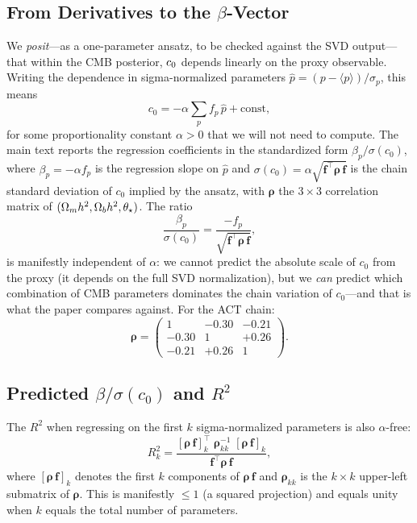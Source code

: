 \subsection{From Derivatives to the \texorpdfstring{$\beta$}{beta}-Vector}
\label{app:beta_derivation}

We \emph{posit}---as a one-parameter ansatz, to be checked against the SVD output---that within the CMB posterior, $c_0$ depends linearly on the proxy observable. Writing the dependence in sigma-normalized parameters $\hat{p} = (p - \langle p \rangle)/\sigma_p$, this means
\begin{equation}
c_0 = -\alpha \sum_p f_p \, \hat{p} + \mathrm{const},
\label{eq:c0_linear_model}
\end{equation}
for some proportionality constant $\alpha > 0$ that we will not need to compute. The main text reports the regression coefficients in the standardized form $\beta_p / \sigma(c_0)$, where $\beta_p = -\alpha f_p$ is the regression slope on $\hat{p}$ and $\sigma(c_0) = \alpha \sqrt{\mathbf{f}^\top \boldsymbol{\rho}\, \mathbf{f}}$ is the chain standard deviation of $c_0$ implied by the ansatz, with $\boldsymbol{\rho}$ the $3 \times 3$ correlation matrix of $(\Omega_m h^2, \Omega_b h^2, \theta_\star)$. The ratio
\begin{equation}
\frac{\beta_p}{\sigma(c_0)} = \frac{-f_p}{\sqrt{\mathbf{f}^\top \boldsymbol{\rho}\, \mathbf{f}}},
\label{eq:beta_over_sigma}
\end{equation}
is manifestly independent of $\alpha$: we cannot predict the absolute scale of $c_0$ from the proxy (it depends on the full SVD normalization), but we \emph{can} predict which combination of CMB parameters dominates the chain variation of $c_0$---and that is what the paper compares against. For the ACT chain:
\begin{equation}
\boldsymbol{\rho} = \begin{pmatrix} 1 & -0.30 & -0.21 \\ -0.30 & 1 & +0.26 \\ -0.21 & +0.26 & 1 \end{pmatrix}.
\label{eq:rho_matrix}
\end{equation}

\subsection{Predicted \texorpdfstring{$\beta/\sigma(c_0)$}{beta/sigma} and \texorpdfstring{$R^2$}{R2}}
\label{app:predictions}

The $R^2$ when regressing on the first $k$ sigma-normalized parameters is also $\alpha$-free:
\begin{equation}
R^2_k = \frac{[\boldsymbol{\rho}\,\mathbf{f}]_k^\top \; \boldsymbol{\rho}_{kk}^{-1} \; [\boldsymbol{\rho}\,\mathbf{f}]_k}{\mathbf{f}^\top \boldsymbol{\rho}\, \mathbf{f}},
\label{eq:R2_prediction}
\end{equation}
where $[\boldsymbol{\rho}\,\mathbf{f}]_k$ denotes the first $k$ components of $\boldsymbol{\rho}\,\mathbf{f}$ and $\boldsymbol{\rho}_{kk}$ is the $k \times k$ upper-left submatrix of $\boldsymbol{\rho}$. This is manifestly $\leq 1$ (a squared projection) and equals unity when $k$ equals the total number of parameters.

